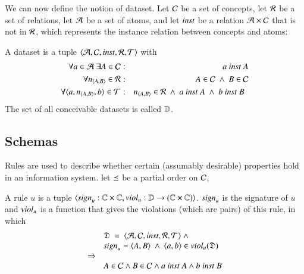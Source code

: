 \documentclass{elsarticle}
\begin{document}
   We can now define the notion of dataset.
   Let $\mathcal{C}$ be a set of concepts,
   let $\mathcal{R}$ be a set of relations,
   let $\mathcal{A}$ be a set of atoms,
   and let $\text{\it inst\/}$ be a relation $\mathcal{A}\times\mathcal{C}$ that is not in $\mathcal{R}$,
   which represents the instance relation between concepts and atoms:
\begin{definition}[dataset]
   \label{def:dataset}
   \item A dataset is a tuple $\langle\mathcal{A},\mathcal{C},\text{\it inst\/},\mathcal{R},\mathcal{T}\rangle$ with
   \begin{eqnarray}
      \forall a\in\atoms\ \exists A\in\concepts&:&a\ \inst\ A\\
      \forall \declare{n}{A}{B}\in\rels&:&A\in\concepts\ \wedge\ B\in\concepts\\
      \forall\triple{a}{\declare{n}{A}{B}}{b}\in\triples&:&\begin{array}[t]{@{}l}\declare{n}{A}{B}\in\rels\ \wedge\ a\ \inst\ A\ \wedge\ b\ \inst\ B\end{array}
   \end{eqnarray}
   The set of all conceivable datasets is called $\mathbb{D}$.
\end{definition}

\subsection{Schemas}
\label{sct:Schemas}
   Rules are used to describe whether certain (assumably desirable) properties hold in an information system.
   let $\preceq$ be a partial order on $\mathcal{C}$,

\begin{definition}[rule]
   \label{def:rule}
   \item A rule $u$ is a tuple $\langle \text{\it sign\/}_u:\mathbb{C}\times\mathbb{C},\text{\it viol\/}_u:\mathbb{D}\rightarrow(\mathbb{C}\times\mathbb{C})\rangle$.
   $\text{\it sign\/}_u$ is the signature of $u$ and
   $\text{\it viol\/}_u$ is a function that gives the violations (which are pairs) of this rule,
   in which
\begin{eqnarray}
   \begin{array}[t]{rl}
      &\mathfrak{D}\ =\ \langle\mathcal{A},\mathcal{C},\text{\it inst\/},\mathcal{R},\mathcal{T}\rangle\ \wedge\\
      &\text{\it sign\/}_u=\langle{A},{B}\rangle\ \wedge\ \langle{a},{b}\rangle\in\text{\it viol\/}_{u}(\mathfrak{D})\\
      \Rightarrow\\
      &A\in\mathcal{C}\wedge B\in\mathcal{C}\wedge a\ \text{\it inst\/}\ A\wedge b\ \text{\it inst\/}\ B
   \end{array}
\end{eqnarray}
\end{definition}
\end{document}
